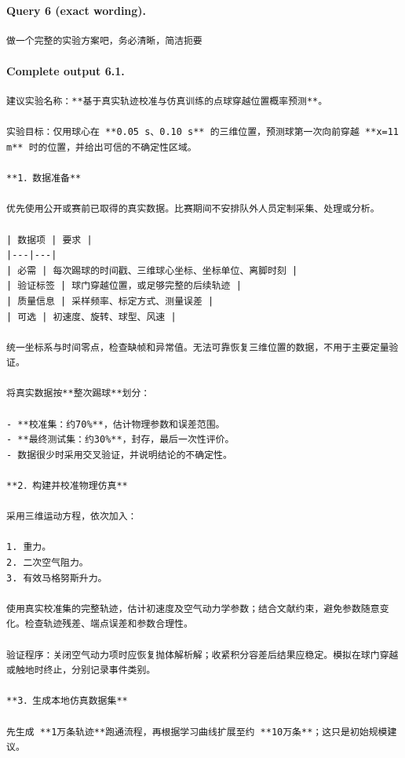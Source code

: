 \documentclass[UTF8,10pt]{ctexart}
\begin{document}
\paragraph{Query 6 (exact wording).}
\begin{Verbatim}[breaklines=true,breakanywhere=true,fontsize=\scriptsize,frame=single,framesep=2pt]
做一个完整的实验方案吧，务必清晰，简洁扼要
\end{Verbatim}

\paragraph{Complete output 6.1.}
\begin{Verbatim}[breaklines=true,breakanywhere=true,fontsize=\scriptsize,frame=single,framesep=2pt]
建议实验名称：**基于真实轨迹校准与仿真训练的点球穿越位置概率预测**。

实验目标：仅用球心在 **0.05 s、0.10 s** 的三维位置，预测球第一次向前穿越 **x=11 m** 时的位置，并给出可信的不确定性区域。

**1．数据准备**

优先使用公开或赛前已取得的真实数据。比赛期间不安排队外人员定制采集、处理或分析。

| 数据项 | 要求 |
|---|---|
| 必需 | 每次踢球的时间戳、三维球心坐标、坐标单位、离脚时刻 |
| 验证标签 | 球门穿越位置，或足够完整的后续轨迹 |
| 质量信息 | 采样频率、标定方式、测量误差 |
| 可选 | 初速度、旋转、球型、风速 |

统一坐标系与时间零点，检查缺帧和异常值。无法可靠恢复三维位置的数据，不用于主要定量验证。

将真实数据按**整次踢球**划分：

- **校准集：约70%**，估计物理参数和误差范围。
- **最终测试集：约30%**，封存，最后一次性评价。
- 数据很少时采用交叉验证，并说明结论的不确定性。

**2．构建并校准物理仿真**

采用三维运动方程，依次加入：

1. 重力。
2. 二次空气阻力。
3. 有效马格努斯升力。

使用真实校准集的完整轨迹，估计初速度及空气动力学参数；结合文献约束，避免参数随意变化。检查轨迹残差、端点误差和参数合理性。

验证程序：关闭空气动力项时应恢复抛体解析解；收紧积分容差后结果应稳定。模拟在球门穿越或触地时终止，分别记录事件类别。

**3．生成本地仿真数据集**

先生成 **1万条轨迹**跑通流程，再根据学习曲线扩展至约 **10万条**；这只是初始规模建议。


\end{Verbatim}
\end{document}
